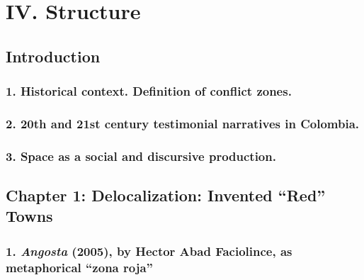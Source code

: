 \documentclass[
  11pt,
,
onecolumn,
openany
]{book}
\begin{document}
\hypertarget{iv.-structure}{%
\chapter{IV. Structure}\label{iv.-structure}}

\hypertarget{introduction}{%
\section{\texorpdfstring{\textbf{Introduction}}{Introduction}}\label{introduction}}

\hypertarget{historical-context.-definition-of-conflict-zones.}{%
\subsection{1. Historical context. Definition of conflict
zones.}\label{historical-context.-definition-of-conflict-zones.}}

\hypertarget{th-and-21st-century-testimonial-narratives-in-colombia.}{%
\subsection{2. 20th and 21st century testimonial narratives in
Colombia.}\label{th-and-21st-century-testimonial-narratives-in-colombia.}}

\hypertarget{space-as-a-social-and-discursive-production.}{%
\subsection{3. Space as a social and discursive
production.}\label{space-as-a-social-and-discursive-production.}}

\hypertarget{chapter-1-delocalization-invented-red-towns}{%
\section{\texorpdfstring{\textbf{Chapter 1: Delocalization: Invented ``Red''
Towns}}{Chapter 1: Delocalization: Invented ``Red'' Towns}}\label{chapter-1-delocalization-invented-red-towns}}

\hypertarget{angosta-2005-by-hector-abad-faciolince-as-metaphorical-zona-roja}{%
\subsection{\texorpdfstring{1. \emph{Angosta} (2005), by Hector Abad
Faciolince, as metaphorical ``zona
roja''}{1. Angosta (2005), by Hector Abad Faciolince, as metaphorical ``zona roja''}}\label{angosta-2005-by-hector-abad-faciolince-as-metaphorical-zona-roja}}
\end{document}
